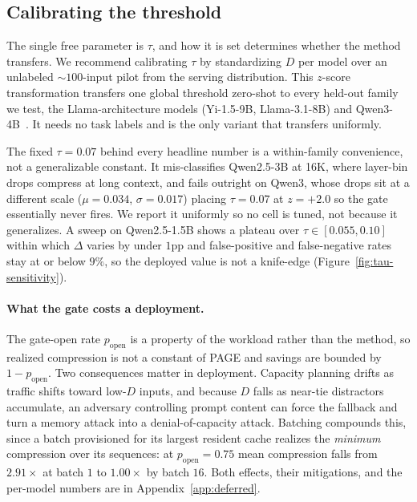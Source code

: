 \documentclass{article}
\newcommand{\method}{PAGE\xspace}
\begin{document}
\subsection{Calibrating the threshold}
\label{subsec:calibration}\label{sec:recipe}

The single free parameter is $\tau$, and how it is set determines whether the
method transfers. We recommend calibrating $\tau$ by standardizing $D$ per model over an
unlabeled $\sim 100$-input pilot from the serving distribution. This $z$-score
transformation transfers one global threshold zero-shot to every held-out
family we test, the Llama-architecture models (Yi-1.5-9B, Llama-3.1-8B) and
Qwen3-4B~\citep{Yi_tc,llama_tc,qwen_tc}. It needs no task labels and is the
only variant that transfers uniformly.

The fixed $\tau = 0.07$ behind every headline number is a within-family
convenience, not a generalizable constant. It mis-classifies Qwen2.5-3B at
16K, where layer-bin drops compress at long context, and fails outright on
Qwen3, whose drops sit at a different scale ($\mu = 0.034$, $\sigma = 0.017$)
placing $\tau = 0.07$ at $z = +2.0$ so the gate essentially never fires. We
report it uniformly so no cell is tuned, not because it generalizes. A sweep
on Qwen2.5-1.5B shows a plateau over $\tau \in [0.055, 0.10]$ within which
$\Delta$ varies by under $1$pp and false-positive and false-negative rates
stay at or below $9\%$, so the deployed value is not a knife-edge
(Figure~\ref{fig:tau-sensitivity}).

\paragraph{What the gate costs a deployment.} The gate-open rate
$p_{\text{open}}$ is a property of the workload rather than the method, so
realized compression is not a constant of \method and savings are bounded by
$1 - p_{\text{open}}$. Two consequences matter in deployment. Capacity
planning drifts as traffic shifts toward low-$D$ inputs, and because $D$ falls
as near-tie distractors accumulate, an adversary controlling prompt content
can force the fallback and turn a memory attack into a denial-of-capacity
attack. Batching compounds this, since a batch provisioned for its largest
resident cache realizes the \emph{minimum} compression over its sequences: at
$p_{\text{open}} = 0.75$ mean compression falls from $2.91\times$ at batch $1$
to $1.00\times$ by batch $16$. Both effects, their mitigations, and the per-model numbers are in Appendix~\ref{app:deferred}.
\end{document}
